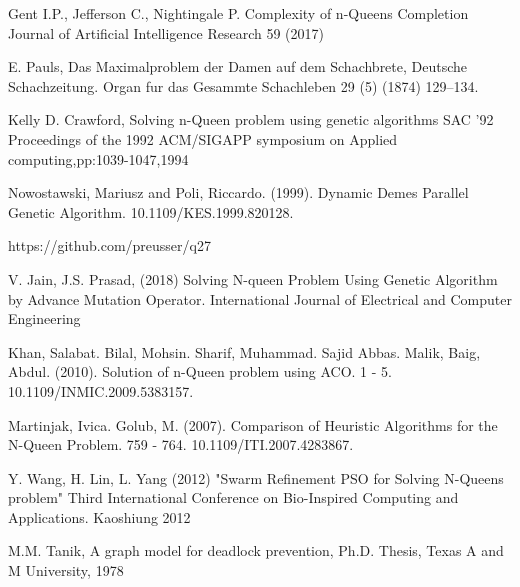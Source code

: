 \documentclass[a4paper,onecolumn,11pt]{article}
\begin{document}
\begin{thebibliography}{99.}

 Gent I.P., Jefferson C., Nightingale P. 	Complexity of n-Queens Completion Journal of Artificial Intelligence Research 59 (2017) 

 E. Pauls, Das Maximalproblem der Damen auf dem Schachbrete, Deutsche Schachzeitung. Organ fur das Gesammte Schachleben 29 (5) (1874) 129–134.

 Kelly D. Crawford, Solving n-Queen problem using genetic algorithms SAC '92 Proceedings of the 1992 ACM/SIGAPP symposium on Applied computing,pp:1039-1047,1994 

 Nowostawski, Mariusz and Poli, Riccardo. (1999). Dynamic Demes Parallel Genetic Algorithm. 10.1109/KES.1999.820128. 

 https://github.com/preusser/q27

 V. Jain, J.S. Prasad, (2018) Solving N-queen Problem Using Genetic Algorithm by Advance Mutation Operator. International Journal of Electrical and Computer Engineering

 Khan, Salabat. Bilal, Mohsin. Sharif, Muhammad. Sajid Abbas. Malik, Baig, Abdul. (2010). Solution of n-Queen problem using ACO. 1 - 5. 10.1109/INMIC.2009.5383157. 

 Martinjak, Ivica. Golub, M. (2007). Comparison of Heuristic Algorithms for the N-Queen Problem. 759 - 764. 10.1109/ITI.2007.4283867.

  Y. Wang, H. Lin, L. Yang (2012) "Swarm Refinement PSO for Solving N-Queens problem" Third International Conference on Bio-Inspired Computing and Applications. Kaoshiung 2012

 M.M. Tanik, A graph model for deadlock prevention, Ph.D. Thesis, Texas A and M University, 1978




\end{thebibliography}
\end{document}
